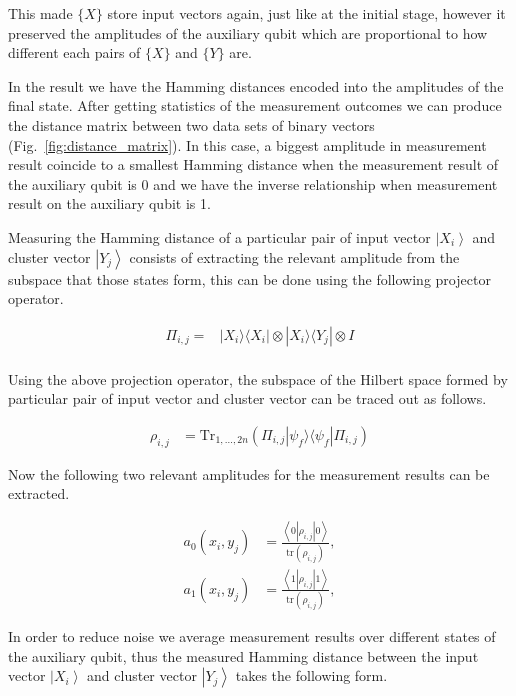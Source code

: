 \documentclass[pra,showkeys,twocolumn,showpacs]{revtex4-1}
\begin{document}
This made $\{X\}$ store input vectors again, just like at the initial stage, however it preserved the amplitudes of the auxiliary qubit which are proportional to how different each pairs of $\{X\}$ and $\{Y\}$ are.

In the result we have the Hamming distances encoded into the amplitudes of the final state. After getting statistics of the measurement outcomes we can produce the distance matrix between two data sets of binary vectors (Fig.~\ref{fig:distance_matrix}). In this case, a biggest amplitude in measurement result coincide to a smallest Hamming distance when the measurement result of the auxiliary qubit is 0 and we have the inverse relationship when measurement result on the auxiliary qubit is 1.

Measuring the Hamming distance of a particular pair of input vector $\left| X_i \right\rangle$ and cluster vector $\left| Y_j \right\rangle$ consists of extracting the relevant amplitude from the subspace that those states form, this can be done using the following projector operator.

\begin{align}
\Pi_{i,j} = &\left| X_i \rangle\langle X_i \right| \otimes \left| X_i \rangle\langle Y_j \right| \otimes I \nonumber \\ 
\end{align} 

Using the above projection operator, the subspace of the Hilbert space formed by particular pair of input vector and cluster vector can be traced out as follows.

\begin{align}
    \rho_{i,j} &= \text{Tr}_{1,\dots,2n} (\Pi_{i,j} \left| \psi_f \rangle\langle \psi_f \right| \Pi_{i,j})
\end{align}

Now the following two relevant amplitudes for the measurement results can be extracted.

\begin{align}
    a_0(x_i,y_j) & = \frac{\left\langle 0 |\rho_{i,j}| 0 \right\rangle}{\text{tr}(\rho_{i,j})},  \\
    a_1(x_i,y_j) & = \frac{\left\langle 1 |\rho_{i,j}| 1 \right\rangle}{\text{tr}(\rho_{i,j})},
\end{align}

In order to reduce noise we average measurement results over different states of the auxiliary qubit, thus the measured Hamming distance between the input vector $\left| X_i \right\rangle$ and cluster vector $\left| Y_j \right\rangle$ takes the following form.
\end{document}

